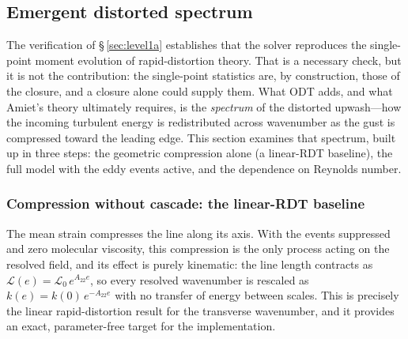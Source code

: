 %

\subsection{Emergent distorted spectrum}\label{sec:val-spectrum}

The verification of \S\,\ref{sec:level1a} establishes that the solver
reproduces the single-point moment evolution of rapid-distortion theory. That
is a necessary check, but it is not the contribution: the single-point
statistics are, by construction, those of the closure, and a closure alone
could supply them. What ODT adds, and what Amiet's theory ultimately requires,
is the \emph{spectrum} of the distorted upwash---how the incoming turbulent
energy is redistributed across wavenumber as the gust is compressed toward the
leading edge. This section examines that spectrum, built up in three steps:
the geometric compression alone (a linear-RDT baseline), the full model with
the eddy events active, and the dependence on Reynolds number.

\subsubsection{Compression without cascade: the linear-RDT
baseline}\label{sec:spec-rdt}

The mean strain compresses the line along its axis. With the events
suppressed and zero molecular viscosity, this compression is the only
process acting on the resolved field, and its effect is purely kinematic:
the line length contracts as $\mathcal{L}(e)=\mathcal{L}_0\,e^{A_{22}e}$, so
every resolved wavenumber is rescaled as $k(e)=k(0)\,e^{-A_{22}e}$ with no
transfer of energy between scales. This is precisely the linear
rapid-distortion result for the transverse wavenumber, and it provides an
exact, parameter-free target for the implementation.

